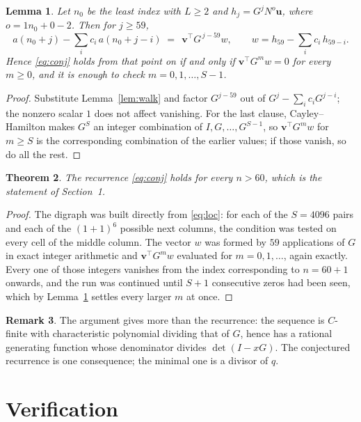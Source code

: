 \documentclass[11pt,a4paper]{article}
\theoremstyle{plain}
\newtheorem{theorem}{Theorem}
\newtheorem{lemma}[theorem]{Lemma}
\theoremstyle{definition}
\newtheorem{remark}[theorem]{Remark}
\begin{document}
\begin{lemma}\label{lem:crit}
Let $n_0$ be the least index with $L\ge2$ and $h_j=G^{j}N^{o}\mathbf{u}$, where
$o=1n_0+0-2$. Then for $j\ge59$,
\[
a(n_0+j)-\sum_i c_i\,a(n_0+j-i)\;=\;\,\mathbf{v}^{\!\top}G^{\,j-59}w,
\qquad w=h_{59}-\sum_i c_i\,h_{59-i} .
\]
Hence \eqref{eq:conj} holds from that point on if and only if
$\mathbf{v}^{\!\top}G^{m}w=0$ for every $m\ge0$, and it is enough to check
$m=0,1,\dots,S-1$.
\end{lemma}

\begin{proof}
Substitute Lemma~\ref{lem:walk} and factor $G^{j-59}$ out of
$G^{j}-\sum_ic_iG^{j-i}$; the nonzero scalar $1$ does not affect
vanishing. For the last clause, Cayley--Hamilton makes $G^{S}$ an integer combination of
$I,G,\dots,G^{S-1}$, so $\mathbf{v}^{\!\top}G^{m}w$ for $m\ge S$ is the corresponding
combination of the earlier values; if those vanish, so do all the rest.
\end{proof}

\begin{theorem}
The recurrence \eqref{eq:conj} holds for every $n>60$, which is the statement of
Section~1.
\end{theorem}

\begin{proof}
The digraph was built directly from \eqref{eq:loc}: for each of the $S=4096$ pairs and each
of the $(1+1)^{6}$ possible next columns, the condition was tested on every cell of
the middle column. The vector $w$ was formed by $59$ applications of $G$ in exact integer
arithmetic and $\mathbf{v}^{\!\top}G^{m}w$ evaluated for $m=0,1,\dots$, again exactly.
Every one of those integers vanishes from the index corresponding to $n=60+1$ onwards,
and the run was continued until $S+1$ consecutive zeros had been seen, which by
Lemma~\ref{lem:crit} settles every larger $m$ at once.
\end{proof}

\begin{remark}
The argument gives more than the recurrence: the sequence is $C$-finite with characteristic
polynomial dividing that of $G$, hence has a rational generating function whose denominator
divides $\det(I-xG)$. The conjectured recurrence is one consequence; the minimal one is a
divisor of $q$.
\end{remark}

\section{Verification}
\end{document}
